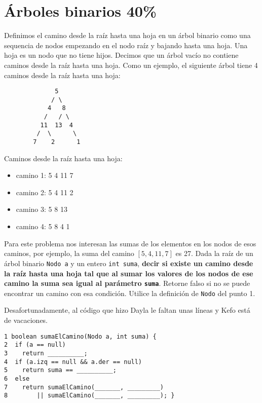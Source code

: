 \documentclass[twocolumn]{article}
\begin{document}
\section{Árboles binarios 40\%}

Definimos el camino desde la raíz hasta una hoja en un árbol binario como una sequencia de nodos empezando
en el nodo raíz y bajando hasta una hoja. Una hoja es un nodo que no tiene hijos. Decimos que un árbol vacío no contiene
caminos desde la raíz hasta una hoja. Como un ejemplo, el siguiente árbol tiene 4 caminos desde la raíz hasta una hoja:
\vspace{2cm}
{\small
\begin{verbatim}
              5
             / \
            4   8
           /   / \
          11  13  4
         /  \      \
        7    2      1
\end{verbatim}
}

Caminos desde la raíz hasta una hoja:\\
\begin{itemize}
 \item  camino 1: 5 4 11 7
   \item camino 2: 5 4 11 2
   \item camino 3: 5 8 13
   \item camino 4: 5 8 4 1\\
 \end{itemize}

Para este problema nos interesan las sumas de los elementos en los nodos de esos caminos, por ejemplo, la suma del camino $[5,4,11,7]$ es 27.
Dada la raíz de un árbol binario \texttt{Nodo a} y un entero \texttt{int suma}, \textbf{decir si existe un camino desde la raíz hasta una hoja tal
que al sumar los valores de los nodos de ese camino la suma sea igual al parámetro \texttt{suma}}. Retorne falso si no se puede encontrar
un camino con esa condición. Utilice la definición de \texttt{Nodo} del punto 1.

Desafortunadamente, al código que hizo Dayla le faltan unas líneas y Kefo está de vacaciones.

{\small
\begin{verbatim}
1 boolean sumaElCamino(Nodo a, int suma) {
2  if (a == null)
3    return __________;
4  if (a.izq == null && a.der == null)
5    return suma == __________;
6  else
7    return sumaElCamino(_______, _________) 
8        || sumaElCamino(_______, _________); }
\end{verbatim}
}
\end{document}
